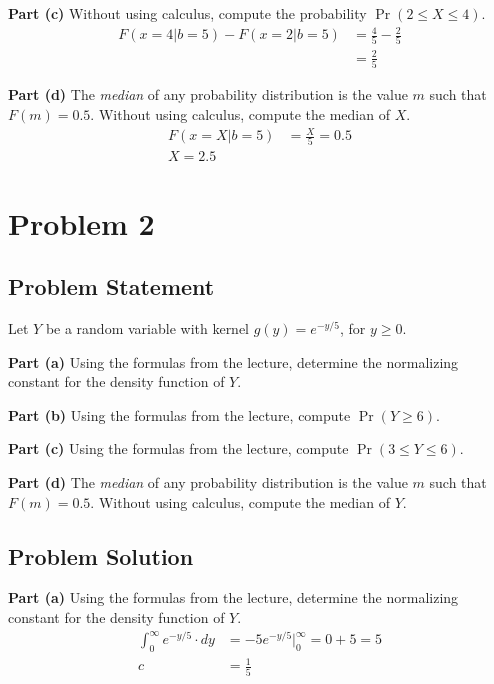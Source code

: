\documentclass[12pt]{article}
\theoremstyle{definition}
\begin{document}
\bigskip
\noindent
{\bf Part (c)} Without using calculus, compute the probability $\Pr(2 \leq X \leq 4)$.
\begin{align*}
F(x=4|b=5) - F(x=2|b=5) &= \frac{4}{5} - \frac{2}{5}\\
&= \frac{2}{5}
\end{align*}

\bigskip
\noindent
{\bf Part (d)} The {\em median} of any probability distribution is the value $m$ such that $F(m) = 0.5$. Without using calculus, compute the median of $X$.
\begin{align*}
F(x=X|b=5) &= \frac{X}{5} = 0.5\\
X = 2.5
\end{align*}


\newpage
\section*{Problem 2}

\subsection*{Problem Statement}

Let $Y$ be a random variable with kernel $g(y) = e^{-y/5}$, for $y \geq 0$.

\bigskip
\noindent
{\bf Part (a)} Using the formulas from the lecture, determine the normalizing constant for the density function of $Y$.

\bigskip
\noindent
{\bf Part (b)} Using the formulas from the lecture, compute $\Pr( Y \geq 6)$.

\bigskip
\noindent
{\bf Part (c)} Using the formulas from the lecture, compute $\Pr( 3 \leq Y \leq 6)$.


\bigskip
\noindent
{\bf Part (d)} The {\em median} of any probability distribution is the value $m$ such that $F(m) = 0.5$. Without using calculus, compute the median of $Y$.






\subsection*{Problem Solution}
\bigskip
\noindent
{\bf Part (a)} Using the formulas from the lecture, determine the normalizing constant for the density function of $Y$.
\begin{align*}
\int_0^\infty e^{-y/5}\cdot dy &= -5e^{-y/5}\biggr\rvert_0^{\infty} = 0 + 5 = 5\\
c &= \frac{1}{5}
\end{align*}
\end{document}
